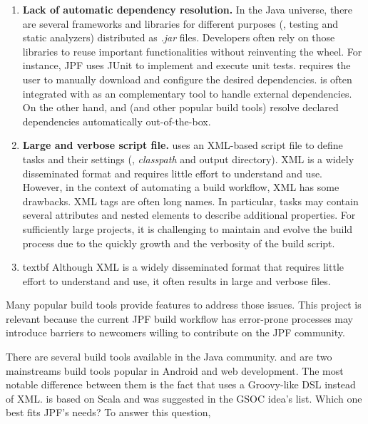 \documentclass[a4paper, 12pt]{article}
\begin{document}
\begin{enumerate}

\item \textbf{Lack of automatic dependency resolution.}
In the Java universe, there are several frameworks and libraries for different
purposes (\eg, testing and static analyzers) distributed as \emph{.jar} files.
Developers often rely on those libraries to reuse important functionalities
without reinventing the wheel.
For instance, JPF uses JUnit to implement and execute unit tests.
\ant{} requires the user to manually download and configure the desired
dependencies.
\ant{} is often integrated with \ivy{}\cite{page:ivy} as an complementary
tool to handle external dependencies.
On the other hand, \gradle{} and \maven{} (and other popular build tools)
resolve declared dependencies automatically out-of-the-box.

\item \textbf{Large and verbose script file.}
\ant{} uses an XML-based script file to define tasks and their settings (\eg,
\emph{classpath} and output directory).
XML is a widely disseminated format and requires little effort to understand
and use.
However, in the context of automating a build workflow, XML has some drawbacks.
XML tags are often long names.
In particular, \ant{} tasks may contain several attributes and nested
elements to describe additional properties.
For sufficiently large projects, it is challenging to maintain and evolve the
build process due to the quickly growth and the verbosity of the build script.

\item textbf{}
Although XML is a widely disseminated format that requires little effort to
understand and use, it often results in large and verbose files.

\end{enumerate}

Many popular build tools provide features to address those issues.
This project is relevant because the current JPF build workflow has error-prone
processes may introduce barriers to newcomers willing to contribute on the JPF
community.

There are several build tools available in the Java community.
\maven{} and \gradle{} are two mainstreams build tools popular in Android and
web development.
The most notable difference between them is the fact that \gradle{} uses a
Groovy-like DSL instead of XML.
\sbt{}\cite{page:sbt} is based on Scala and was suggested in the GSOC idea's
list\cite{page:jpf-gsoc18}.
Which one best fits JPF's needs?
To answer this question, 
\end{document}

